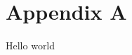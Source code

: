 \pagebreak
\pagestyle{style3}
\renewcommand{\headrulewidth}{0pt}
\setcounter{page}{1}
\section*{Appendix A}

Hello world

\label{last_page_appendix}